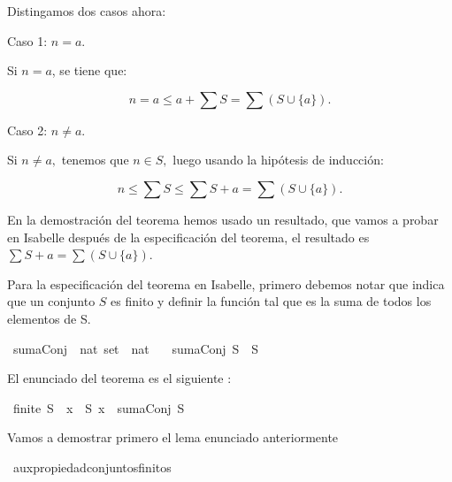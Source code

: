 \begin{isabellebody}
\begin{isamarkuptext}
\begin{demostracion}
Distingamos dos casos ahora:

Caso 1: $n = a$.

Si $n = a$, se tiene que:

$$n = a \leq a + \sum S = \sum (S \cup \{a\}).$$

Caso 2: $n \neq a.$

Si $n \neq a,$ tenemos que $n \in S,$ luego usando la hipótesis de
 inducción:

$$n \leq \sum S \leq \sum S + a = \sum (S \cup \{a\}).$$
\end{demostracion}

En la demostración del teorema hemos usado un resultado, que vamos a
 probar en Isabelle después de la especificación del teorema,
 el resultado es $\sum S + a = \sum (S \cup \{ a\})$.%
\end{isamarkuptext}\isamarkuptrue%
%
\isadelimdocument
%
\endisadelimdocument
%
\isatagdocument
%
\isamarkuptrue%
%
\endisatagdocument
{\isafolddocument}%
%
\isadelimdocument
%
\endisadelimdocument
%
\begin{isamarkuptext}%
Para la especificación del teorema en Isabelle, primero debemos
 notar que   indica que un conjunto $S$ es 
finito  y definir  la función  tal que
  es la suma de todos los elementos de S.%
\end{isamarkuptext}\isamarkuptrue%
\isamarkupfalse%
\ sumaConj\ {\isacharcolon}{\isacharcolon}\ {\isachardoublequoteopen}nat\ set\ {\isasymRightarrow}\ nat{\isachardoublequoteclose}\ \isanewline
\ \ {\isachardoublequoteopen}sumaConj\ S\ {\isasymequiv}\ {\isasymSum}S{\isachardoublequoteclose}%
\begin{isamarkuptext}%
El enunciado del teorema es el siguiente :%
\end{isamarkuptext}\isamarkuptrue%
\isamarkupfalse%
\ {\isachardoublequoteopen}finite\ S\ {\isasymLongrightarrow}\ {\isasymforall}x\ {\isasymin}\ S{\isachardot}\ x\ {\isasymle}\ sumaConj\ S{\isachardoublequoteclose}\isanewline
%
\isadelimproof
\isanewline
\ \ %
\endisadelimproof
%
\isatagproof
{}\isamarkupfalse%
%
\endisatagproof
{\isafoldproof}%
%
\isadelimproof
%
\endisadelimproof
%
\begin{isamarkuptext}%
Vamos a demostrar primero el lema enunciado anteriormente%
\end{isamarkuptext}\isamarkuptrue%
\isamarkupfalse%
\ aux{\isacharunderscore}propiedad{\isacharunderscore}conjuntos{\isacharunderscore}finitos{\isacharcolon}\isanewline

\end{isabellebody}
